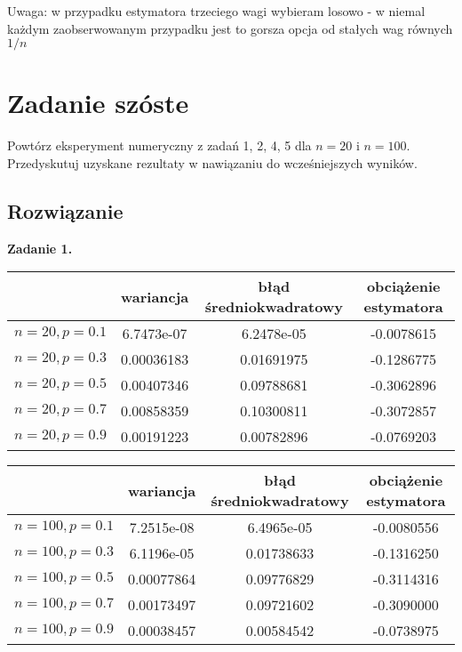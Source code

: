 \documentclass[a4paper]{article}
\begin{document}
Uwaga: w przypadku estymatora trzeciego wagi wybieram losowo - w niemal każdym zaobserwowanym przypadku jest to gorsza opcja od stałych wag równych $1/n$

\newpage

\section{Zadanie szóste}
Powtórz eksperyment numeryczny z zadań 1, 2, 4, 5 dla $n=20$ i $n=100$. Przedyskutuj uzyskane rezultaty w nawiązaniu do wcześniejszych wyników.

\subsection{Rozwiązanie}
\textbf{Zadanie 1.}



\begin{table}[H]
\centering
\begin{tabular}{|c|c|c|c|}
\hline
                  & \textbf{wariancja}   & \textbf{błąd średniokwadratowy} & \textbf{obciążenie estymatora} \\ \hline
$n=20,p=0.1$ & 6.7473e-07 & 6.2478e-05 & -0.0078615 \\ \hline
$n=20,p=0.3$ & 0.00036183 & 0.01691975 & -0.1286775 \\ \hline
$n=20,p=0.5$ & 0.00407346 & 0.09788681 & -0.3062896 \\ \hline
$n=20,p=0.7$ & 0.00858359 & 0.10300811 & -0.3072857 \\ \hline
$n=20,p=0.9$ & 0.00191223 & 0.00782896 & -0.0769203 \\ \hline
\end{tabular}
\end{table}
\begin{table}[H]
\centering
\begin{tabular}{|c|c|c|c|}
\hline
                  & \textbf{wariancja}   & \textbf{błąd średniokwadratowy} & \textbf{obciążenie estymatora} \\ \hline
$n=100,p=0.1$ & 7.2515e-08 & 6.4965e-05 & -0.0080556 \\ \hline
$n=100,p=0.3$ & 6.1196e-05 & 0.01738633 & -0.1316250 \\ \hline
$n=100,p=0.5$ & 0.00077864 & 0.09776829 & -0.3114316 \\ \hline
$n=100,p=0.7$ & 0.00173497 & 0.09721602 & -0.3090000 \\ \hline
$n=100,p=0.9$ & 0.00038457 & 0.00584542 & -0.0738975 \\ \hline
\end{tabular}
\end{table}
\end{document}
